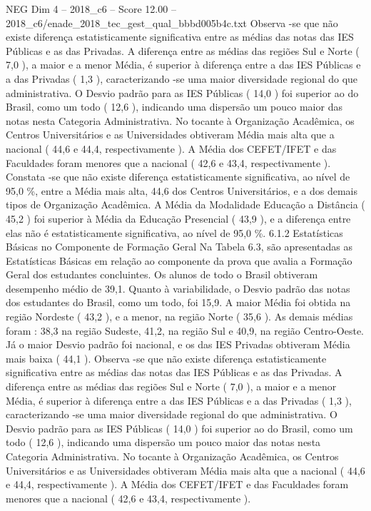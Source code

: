 \begin{textsample}{NEG Dim 4 – 2018\_c6 – Score 12.00 – 2018\_c6/enade\_2018\_tec\_gest\_qual\_bbbd005b4c.txt}
Observa -se que não existe diferença estatisticamente significativa entre as médias das notas das IES Públicas e as das Privadas.
A diferença entre as médias das regiões Sul e Norte ( 7,0 ), a maior e a menor Média, é superior à diferença entre a das IES Públicas e a das Privadas ( 1,3 ), caracterizando -se uma maior diversidade regional do que administrativa.
O Desvio padrão para as IES Públicas ( 14,0 ) foi superior ao do Brasil, como um todo ( 12,6 ), indicando uma dispersão um pouco maior das notas nesta Categoria Administrativa.
No tocante à Organização Acadêmica, os Centros Universitários e as Universidades obtiveram Média mais alta que a nacional ( 44,6 e 44,4, respectivamente ).
A Média dos CEFET/IFET e das Faculdades foram menores que a nacional ( 42,6 e 43,4, respectivamente ).
Constata -se que não existe diferença estatisticamente significativa, ao nível de 95,0 \%, entre a Média mais alta, 44,6 dos Centros Universitários, e a dos demais tipos de Organização Acadêmica.
A Média da Modalidade Educação a Distância ( 45,2 ) foi superior à Média da Educação Presencial ( 43,9 ), e a diferença entre elas não é estatisticamente significativa, ao nível de 95,0 \%. 6.1.2 Estatísticas Básicas no Componente de Formação Geral Na Tabela 6.3, são apresentadas as Estatísticas Básicas em relação ao componente da prova que avalia a Formação Geral dos estudantes concluintes.
Os alunos de todo o Brasil obtiveram desempenho médio de 39,1.
Quanto à variabilidade, o Desvio padrão das notas dos estudantes do Brasil, como um todo, foi 15,9.
A maior Média foi obtida na região Nordeste ( 43,2 ), e a menor, na região Norte ( 35,6 ).
As demais médias foram : 38,3 na região Sudeste, 41,2, na região Sul e 40,9, na região Centro-Oeste.
Já o maior Desvio padrão foi nacional, e os das IES Privadas obtiveram Média mais baixa ( 44,1 ).
Observa -se que não existe diferença estatisticamente significativa entre as médias das notas das IES Públicas e as das Privadas.
A diferença entre as médias das regiões Sul e Norte ( 7,0 ), a maior e a menor Média, é superior à diferença entre a das IES Públicas e a das Privadas ( 1,3 ), caracterizando -se uma maior diversidade regional do que administrativa.
O Desvio padrão para as IES Públicas ( 14,0 ) foi superior ao do Brasil, como um todo ( 12,6 ), indicando uma dispersão um pouco maior das notas nesta Categoria Administrativa.
No tocante à Organização Acadêmica, os Centros Universitários e as Universidades obtiveram Média mais alta que a nacional ( 44,6 e 44,4, respectivamente ).
A Média dos CEFET/IFET e das Faculdades foram menores que a nacional ( 42,6 e 43,4, respectivamente ).

\end{textsample}
